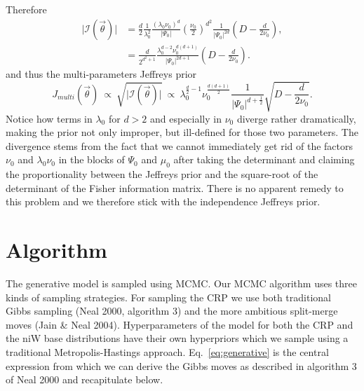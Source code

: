\documentclass[11pt, oneside]{article}   	%
\begin{document}
Therefore
\begin{equation}\begin{split}
\vert\mathcal I(\vec\theta)\vert &= \frac{d}{2}\frac{1}{\lambda_0^2}\frac{(\lambda_0\nu_0)^d}{\vert\Psi_0\vert}\left(\frac{\nu_0}{2}\right)^{d^2}\frac{1}{\vert\Psi_0\vert^{2d}}\left(D - \frac{d}{2\nu_0}\right), \\
&= \frac{d}{2^{d^2 + 1}}\frac{\lambda_0^{d-2}\nu_0^{d(d + 1)}}{\vert\Psi_0\vert^{2d + 1}}\left(D -\frac{d}{2\nu_0}\right).
\end{split}\end{equation}
and thus the multi-parameters Jeffreys prior
$$J_{multi}(\vec\theta)~\propto~ \sqrt{\vert\mathcal I(\vec\theta)\vert}~\propto~\lambda_0^{\frac{d}{2}-1}\nu_0^{\frac{d(d+1)}{2}}\frac{1}{\vert\Psi_0\vert^{d+\frac{1}{2}}}\sqrt{D - \frac{d}{2\nu_0}}.$$
Notice how terms in $\lambda_0$ for $d > 2$ and especially in $\nu_0$ diverge rather dramatically, making the prior not only improper, but ill-defined for those two parameters. The divergence stems from the fact that we cannot immediately get rid of the factors $\nu_0$ and $\lambda_0\nu_0$ in the blocks of $\Psi_0$ and $\mu_0$ after taking the determinant and claiming the proportionality between the Jeffreys prior and the square-root of the determinant of the Fisher information matrix. There is no apparent remedy to this problem and we therefore stick with the independence Jeffreys prior.

\section{Algorithm}
The generative model is sampled using MCMC. Our MCMC algorithm uses three kinds of sampling strategies. For sampling the CRP we use both traditional Gibbs sampling (Neal 2000, algorithm 3) and the more ambitious split-merge moves (Jain \& Neal 2004). Hyperparameters of the model for both the CRP and the niW base distributions have their own hyperpriors which we sample using a traditional Metropolis-Hastings approach. Eq.~\ref{eq:generative} is the central expression from which we can derive the Gibbs moves as described in algorithm 3 of Neal 2000 and recapitulate below.
\end{document}
